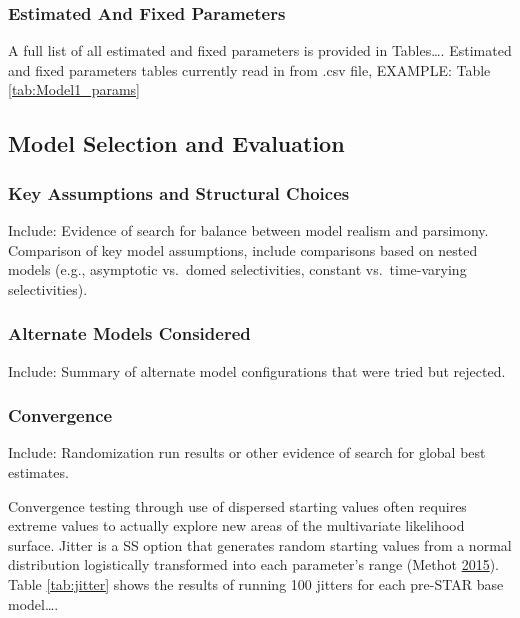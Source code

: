 \documentclass[12pt,]{article}
\begin{document}
\subsubsection{Estimated And Fixed
Parameters}\label{estimated-and-fixed-parameters}

A full list of all estimated and fixed parameters is provided in
Tables\ldots{}. Estimated and fixed parameters tables currently read in
from .csv file, EXAMPLE: Table \ref{tab:Model1_params}

\subsection{Model Selection and
Evaluation}\label{model-selection-and-evaluation}

\subsubsection{Key Assumptions and Structural
Choices}\label{key-assumptions-and-structural-choices}

Include: Evidence of search for balance between model realism and
parsimony.\\
Comparison of key model assumptions, include comparisons based on nested
models (e.g., asymptotic vs.~domed selectivities, constant
vs.~time-varying selectivities).

\subsubsection{Alternate Models
Considered}\label{alternate-models-considered}

Include: Summary of alternate model configurations that were tried but
rejected.

\subsubsection{Convergence}\label{convergence}

Include: Randomization run results or other evidence of search for
global best estimates.

Convergence testing through use of dispersed starting values often
requires extreme values to actually explore new areas of the
multivariate likelihood surface. Jitter is a SS option that generates
random starting values from a normal distribution logistically
transformed into each parameter's range (Methot
\protect\hyperlink{ref-Methot2015}{2015}). Table \ref{tab:jitter} shows
the results of running 100 jitters for each pre-STAR base model\ldots{}.
\end{document}
